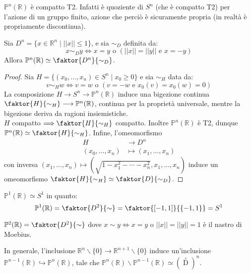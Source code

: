 \begin{oss}
$\mathbb{P}^n(\mathbb{R})$ è compatto T2. Infatti è quoziente di $S^n$ (che è compatto T2) per l'azione di un gruppo finito, azione che perciò è sicuramente propria (in realtà è propriamente discontinua).
\end{oss}

\begin{prop}
Sia $D^n=\{x \in \mathbb{R}^n \mid ||x|| \le 1 \}$, e sia $\sim _D$ definita da:
$$x \sim _D y \Longleftrightarrow x=y \text{ o } (||x||=||y|| \text{ e } x=-y)$$
Allora $\mathbb{P}^n(\mathbb{R}) \simeq \faktor{D^n}{\sim _D}$.
\end{prop}
\begin{proof}
Sia $H=\{(x_0,\dots,x_n) \in S^n \mid x_0 \ge 0 \}$ e sia $\sim _H$ data da:
$$v \sim _H w \Longleftrightarrow v=w \text{ o } (v=-w \text{ e } x_0(v)=x_0(w)=0)$$
La composizione $H \longrightarrow S^n \longrightarrow \mathbb{P}^n(\mathbb{R})$ induce una bigezione continua $\faktor{H}{\sim _H} \longrightarrow \mathbb{P}^n(\mathbb{R})$, continua per la proprietà universale, mentre la bigezione deriva da ragioni insiemistiche.\\
$H$ compatto $\Longrightarrow \faktor{H}{\sim _H}$ compatto. Inoltre $\mathbb{P}^n(\mathbb{R})$ è T2, dunque $\mathbb{P}^n(\mathbb{R}) \simeq \faktor{H}{\sim _H}$. Infine, l'omeomorfismo 
\begin{align*}
H &\longrightarrow D^n \\
(x_0,\dots,x_n) &\longmapsto (x_1,\dots,x_n)
\end{align*} 
con inversa $(x_1,\dots,x_n) \longmapsto (\sqrt{1-x_1^2-\cdots-x_n^2},x_1,\dots,x_n)$ induce un omeomorfismo $\faktor{H}{\sim _H} \simeq \faktor{D}{\sim _D}$.
\end{proof}

\begin{oss}
$\mathbb{P}^1(\mathbb{R}) \simeq S^1$ in quanto:
$$ \mathbb{P}^1(\mathbb{R})=\faktor{D^2}{\sim}=\faktor{[-1,1]}{\{-1,1\}}=S^1 $$
\end{oss}

\begin{oss}
$\mathbb{P}^2(\mathbb{R})=\faktor{D^2}{\sim}$ dove $x\sim y \Longleftrightarrow x=y \text{ o } ||x||=||y||=1$ è il nastro di Moebius.
\end{oss}

In generale, l'inclusione $\mathbb{R}^n \smallsetminus \{0\} \longrightarrow \mathbb{R}^{n+1} \smallsetminus \{0\}$ induce un'inclusione $\mathbb{P}^{n-1}(\mathbb{R}) \hookrightarrow \mathbb{P}^n(\mathbb{R})$, tale che $\mathbb{P}^n(\mathbb{R})\smallsetminus \mathbb{P}^{n-1}(\mathbb{R}) \simeq (\mathop D\limits ^\circ)^n$.

